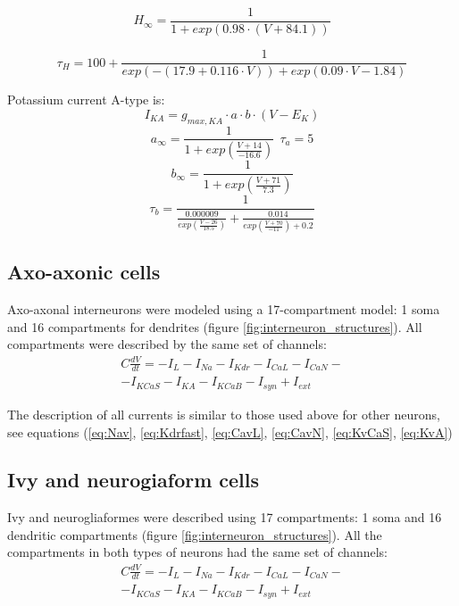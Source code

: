 \documentclass[a4paper,12pt]{article}
\begin{document}
\begin{equation}
H_{\infty} =  \frac{1}{1 + exp(0.98 \cdot(V + 84.1))}
\end{equation}

\begin{equation}
\tau_{H} = 100 + \frac{1}{exp(-(17.9+0.116\cdot V)) + exp(0.09 \cdot V-1.84)   }
\end{equation}

Potassium current A-type is:
\begin{equation}
\label{eq:KvAolm}
I_{KA} = g_{max, KA} \cdot a \cdot b \cdot (V - E_K)
\end{equation}
\begin{equation}
a_{\infty} = \frac{1}{1 + exp(\frac{V + 14}{-16.6})  } \ \ \tau_a = 5
\end{equation}
\begin{equation}
b_{\infty} = \frac{1}{1 + exp(\frac{V + 71}{7.3})  }
\end{equation}
\begin{equation}
\tau_b = \frac{1}{\frac{0.000009}{exp(\frac{V - 26}{18.5})}  + \frac{0.014}{exp(\frac{V +70}{-11}) + 0.2} }
\end{equation}


\subsection{Axo-axonic cells}
Axo-axonal interneurons were modeled using a 17-compartment model: 1 soma and 16 compartments for dendrites (figure \ref{fig:interneuron_structures}). All compartments were described by the same set of channels:
\begin{eqnarray}
C\frac{dV}{dt}=-I_L-I_{Na}-I_{Kdr}-I_{CaL}-I_{CaN}- \nonumber \\ 
-I_{KCaS}-I_{KA}-I_{KCaB}-I_{syn} + I_{ext}
\end{eqnarray}

The description of all currents is similar to those used above for other neurons, see equations (\ref{eq:Nav}, \ref{eq:Kdrfast}, \ref{eq:CavL}, \ref{eq:CavN}, \ref{eq:KvCaS}, \ref{eq:KvA})

\subsection{Ivy and neurogiaform cells}
Ivy and neurogliaformes were described using 17 compartments: 1 soma and 16 dendritic compartments (figure \ref{fig:interneuron_structures}). All the compartments in both types of neurons had the same set of channels:
\begin{eqnarray}
C\frac{dV}{dt}=-I_L-I_{Na}-I_{Kdr} - I_{CaL}-I_{CaN}- \nonumber \\
-I_{KCaS} -I_{KA}-I_{KCaB}-I_{syn} + I_{ext}
\end{eqnarray}
\end{document}
